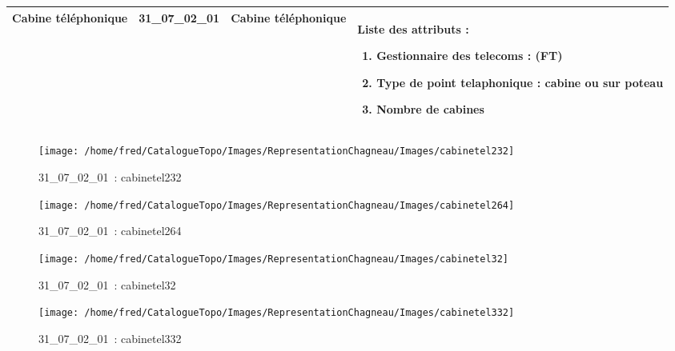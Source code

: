 \documentclass[12pt,titlepage]{book}
\begin{document}
\renewcommand{\arraystretch}{1.2}
\begin{supertabular}{|p{10cm}|c|p{13cm}|p{12cm}|}
 Cabine téléphonique & 31\_07\_02\_01 & Cabine téléphonique & Liste des attributs :
\begin{enumerate}
  \item Gestionnaire des telecoms : (FT)  \item Type de point telaphonique : cabine ou sur poteau  \item Nombre de cabines\end{enumerate}
\\
\hline
\end{supertabular}
\begin{figure}[h!]
  \hfill         %
  \begin{minipage}[t]{3cm}
    \begin{center}
      \texttt{[image: /home/fred/CatalogueTopo/Images/RepresentationChagneau/Images/cabinetel232]}
      \caption[~31\_07\_02\_01]{\small{31\_07\_02\_01~:} \tiny{cabinetel232}}\label{cabinetel232}
    \end{center}
  \end{minipage}
  \begin{minipage}[t]{3cm}
    \begin{center}
      \texttt{[image: /home/fred/CatalogueTopo/Images/RepresentationChagneau/Images/cabinetel264]}
      \caption[~31\_07\_02\_01]{\small{31\_07\_02\_01~:} \tiny{cabinetel264}}\label{cabinetel264}
    \end{center}
  \end{minipage}
  \begin{minipage}[t]{3cm}
    \begin{center}
      \texttt{[image: /home/fred/CatalogueTopo/Images/RepresentationChagneau/Images/cabinetel32]}
      \caption[~31\_07\_02\_01]{\small{31\_07\_02\_01~:} \tiny{cabinetel32}}\label{cabinetel32}
    \end{center}
  \end{minipage}
  \begin{minipage}[t]{3cm}
    \begin{center}
      \texttt{[image: /home/fred/CatalogueTopo/Images/RepresentationChagneau/Images/cabinetel332]}
      \caption[~31\_07\_02\_01]{\small{31\_07\_02\_01~:} \tiny{cabinetel332}}\label{cabinetel332}

\end{center}
\end{minipage}
\end{figure}
\end{document}

